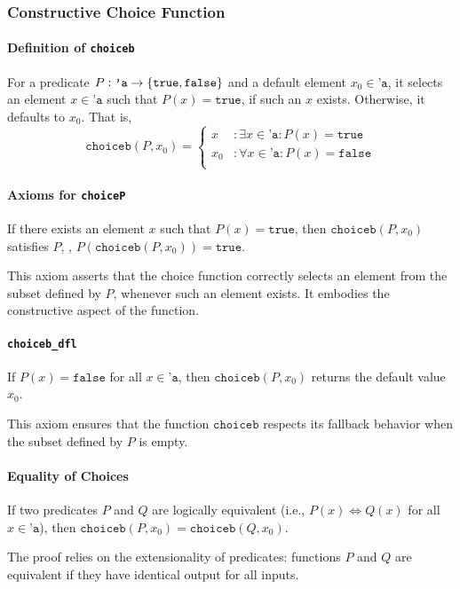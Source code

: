 \newpage
\subsubsection*{Constructive Choice Function}
\paragraph{Definition of \texttt{choiceb}} For a predicate $P:\texttt{'a}\to\set{\texttt{true},\texttt{false}}$ and a default element $x_0\in\texttt{'a}$, it selects an element $x\in\texttt{'a}$ such that $P(x)=\texttt{true}$, if such an $x$ exists. Otherwise, it defaults to $x_0$. That is, \[
\texttt{choiceb}(P,x_0)=
\begin{cases}
	x&:\exists x\in\texttt{'a}:P(x)=\texttt{true}\\
	x_0&:\forall x\in\texttt{'a}:P(x)=\texttt{false}\\
\end{cases}
\]
\paragraph{Axioms for \texttt{choiceP}} If there exists an element 
$x$ such that $P(x)=\texttt{true}$, then $\texttt{choiceb}(P,x_0)$
satisfies $P$, \ie, $P(\texttt{choiceb}(P,x_0))=\texttt{true}$.\par
This axiom asserts that the choice function correctly selects an element from the subset defined by $P$, whenever such an element exists. It embodies the constructive aspect of the function.
\paragraph{\texttt{choiceb\_dfl}} If $P(x)=\texttt{false}$ for all $x\in\texttt{'a}$, then 
$\texttt{choiceb}(P,x_0)$ returns the default value $x_0$.\par
This axiom ensures that the function $\texttt{choiceb}$ respects its fallback behavior when the subset defined by $P$ is empty.
\paragraph{Equality of Choices} If two predicates $P$ and $Q$ are logically equivalent (i.e., $P(x)\Leftrightarrow Q(x)$ for all $x\in\texttt{'a}$), then $\texttt{choiceb}(P,x_0)=\texttt{choiceb}(Q,x_0)$.\par
The proof relies on the extensionality of predicates: functions 
$P$ and $Q$ are equivalent if they have identical output for all inputs.
